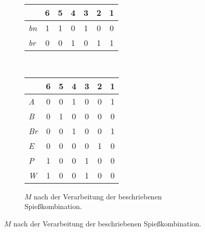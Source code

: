 \begin{figure}[H]
\begin{subfigure}[b]{.59\textwidth}
\begin{tabular}{>{\itshape}l|c|c|c|c|c|c|}
 & 6 & 5 & 4 & 3 & 2 & 1 \\ \hline
\cellcolor{lightblue}bn & 1 & 1 & 0 & 1 & 0 & 0 \\ \hline
\cellcolor{lightred}br & 0 & 0 & 1 & 0 & 1 & 1 \\ \hline
\end{tabular}\\
\vspace{0.5cm}
\begin{tabular}{>{\itshape}l|c|c|c|c|c|c|}
 & 6 & 5 & 4 & 3 & 2 & 1 \\ \hline
\cellcolor{lightred}A & 0 & {\color{red} 0} & 1 &0 & 0 & 1 \\ \hline 
\cellcolor{lightblue}B & 0 & 1 & {\color{red} 0} &0 & 0 & {\color{red} 0} \\ \hline 
\cellcolor{lightred}Br & 0 & {\color{red} 0} & 1 &0 & 0 & 1 \\ \hline 
\cellcolor{lightred}E & {\color{red} 0} & 0 & 0 & {\color{red} 0} & 1 & 0 \\ \hline 
\cellcolor{lightblue}P & 1 & 0 & 0 & 1 & {\color{red} 0} & 0 \\ \hline 
\cellcolor{lightblue}W & 1 & 0 & 0 & 1 & {\color{red} 0} & 0 \\ \hline
\end{tabular}
\caption{$M$ nach der Verarbeitung der beschriebenen Spießkombination.}
\label{fig:matrix-danach}
\end{subfigure}
\end{figure}
